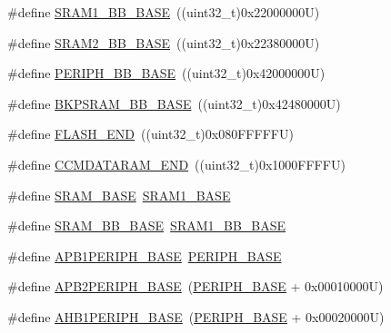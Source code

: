 \begin{DoxyCompactItemize}
\item 
\#define \hyperlink{group___peripheral__registers__structures_gac4c4f61082e4b168f29d9cf97dc3ca5c}{S\+R\+A\+M1\+\_\+\+B\+B\+\_\+\+B\+A\+SE}~((uint32\+\_\+t)0x22000000\+U)
\item 
\#define \hyperlink{group___peripheral__registers__structures_gac33cb6edadf184ab9860d77089503922}{S\+R\+A\+M2\+\_\+\+B\+B\+\_\+\+B\+A\+SE}~((uint32\+\_\+t)0x22380000\+U)
\item 
\#define \hyperlink{group___peripheral__registers__structures_gaed7efc100877000845c236ccdc9e144a}{P\+E\+R\+I\+P\+H\+\_\+\+B\+B\+\_\+\+B\+A\+SE}~((uint32\+\_\+t)0x42000000\+U)
\item 
\#define \hyperlink{group___peripheral__registers__structures_gaee19a30c9fa326bb10b547e4eaf4e250}{B\+K\+P\+S\+R\+A\+M\+\_\+\+B\+B\+\_\+\+B\+A\+SE}~((uint32\+\_\+t)0x42480000\+U)
\item 
\#define \hyperlink{group___peripheral__registers__structures_ga8be554f354e5aa65370f6db63d4f3ee4}{F\+L\+A\+S\+H\+\_\+\+E\+ND}~((uint32\+\_\+t)0x080\+F\+F\+F\+F\+F\+U)
\item 
\#define \hyperlink{group___peripheral__registers__structures_ga9fbe263946209e6f09faf93512bd2f9a}{C\+C\+M\+D\+A\+T\+A\+R\+A\+M\+\_\+\+E\+ND}~((uint32\+\_\+t)0x1000\+F\+F\+F\+F\+U)
\item 
\#define \hyperlink{group___peripheral__registers__structures_ga05e8f3d2e5868754a7cd88614955aecc}{S\+R\+A\+M\+\_\+\+B\+A\+SE}~\hyperlink{group___peripheral__memory__map_ga7d0fbfb8894012dbbb96754b95e562cd}{S\+R\+A\+M1\+\_\+\+B\+A\+SE}
\item 
\#define \hyperlink{group___peripheral__registers__structures_gad3548b6e2f017f39d399358f3ac98454}{S\+R\+A\+M\+\_\+\+B\+B\+\_\+\+B\+A\+SE}~\hyperlink{group___peripheral__memory__map_gac4c4f61082e4b168f29d9cf97dc3ca5c}{S\+R\+A\+M1\+\_\+\+B\+B\+\_\+\+B\+A\+SE}
\item 
\#define \hyperlink{group___peripheral__registers__structures_ga45666d911f39addd4c8c0a0ac3388cfb}{A\+P\+B1\+P\+E\+R\+I\+P\+H\+\_\+\+B\+A\+SE}~\hyperlink{group___peripheral__memory__map_ga9171f49478fa86d932f89e78e73b88b0}{P\+E\+R\+I\+P\+H\+\_\+\+B\+A\+SE}
\item 
\#define \hyperlink{group___peripheral__registers__structures_ga25b99d6065f1c8f751e78f43ade652cb}{A\+P\+B2\+P\+E\+R\+I\+P\+H\+\_\+\+B\+A\+SE}~(\hyperlink{group___peripheral__memory__map_ga9171f49478fa86d932f89e78e73b88b0}{P\+E\+R\+I\+P\+H\+\_\+\+B\+A\+SE} + 0x00010000\+U)
\item 
\#define \hyperlink{group___peripheral__registers__structures_ga811a9a4ca17f0a50354a9169541d56c4}{A\+H\+B1\+P\+E\+R\+I\+P\+H\+\_\+\+B\+A\+SE}~(\hyperlink{group___peripheral__memory__map_ga9171f49478fa86d932f89e78e73b88b0}{P\+E\+R\+I\+P\+H\+\_\+\+B\+A\+SE} + 0x00020000\+U)

\end{DoxyCompactItemize}
